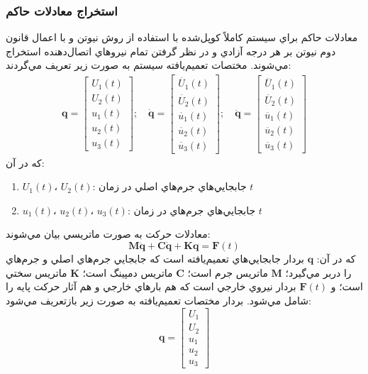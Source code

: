 \subsubsection{استخراج معادلات حاکم}
معادلات حاكم براي سيستم كاملاً كوپل‌شده  با استفاده از روش نیوتن و با اعمال قانون دوم نیوتن بر هر درجه آزادي و در نظر گرفتن تمام نيروهاي اتصال‌دهنده استخراج مي‌شوند. مختصات تعميم‌يافته سيستم به صورت زير تعريف مي‌گردند:
\begin{align}\label{Eq.generalized.coordinate.2dof3dof}
    \mathbf{q} =
    \begin{bmatrix}
        U_1(t) \\
        U_2(t) \\
        u_1(t) \\
        u_2(t) \\
        u_3(t)
    \end{bmatrix}; \quad
    \dot{\mathbf{q}} =
    \begin{bmatrix}
        \dot{U_1}(t) \\
        \dot{U_2}(t) \\
        \dot{u_1}(t) \\
        \dot{u_2}(t) \\
        \dot{u_3}(t)
    \end{bmatrix}; \quad
    \ddot{\mathbf{q}} =
    \begin{bmatrix}
        \ddot{U_1}(t) \\
        \ddot{U_2}(t) \\
        \ddot{u_1}(t) \\
        \ddot{u_2}(t) \\
        \ddot{u_3}(t)
    \end{bmatrix}
\end{align}
كه در آن:
\begin{enumerate}
    \item $U_1(t)$، $U_2(t)$: جابجايي‌هاي جرم‌هاي اصلي در زمان $t$
    \item $u_1(t)$، $u_2(t)$، $u_3(t)$: جابجايي‌هاي جرم‌هاي  در زمان $t$
\end{enumerate}
معادلات حركت به صورت ماتريسي بيان مي‌شوند:
\begin{equation} \label{Eq.EOM_dimensional_combined}
    \mathbf{M} \ddot{\mathbf{q}} + \mathbf{C} \dot{\mathbf{q}} + \mathbf{K} \mathbf{q} = \mathbf{F}(t)
\end{equation}
كه در آن: $\mathbf{q}$ بردار جابجايي‌هاي تعميم‌يافته است كه جابجايي جرم‌هاي اصلي و جرم‌هاي  را دربر مي‌گيرد؛ $\mathbf{M}$ ماتريس جرم است؛ $\mathbf{C}$ ماتريس دمپينگ است؛ $\mathbf{K}$ ماتريس سختي است؛ و $\mathbf{F}(t)$ بردار نيروي خارجي است كه هم بارهاي خارجي و هم آثار حركت پايه را شامل مي‌شود.
بردار مختصات تعميم‌يافته به صورت زير بازتعريف مي‌شود:
\begin{equation}\label{Eq.generalized_coordinate_combined}
    \mathbf{q} = 
  \begin{bmatrix}
    U_1 \\ U_2 \\ u_1 \\ u_2 \\ u_3
  \end{bmatrix}
\end{equation}
